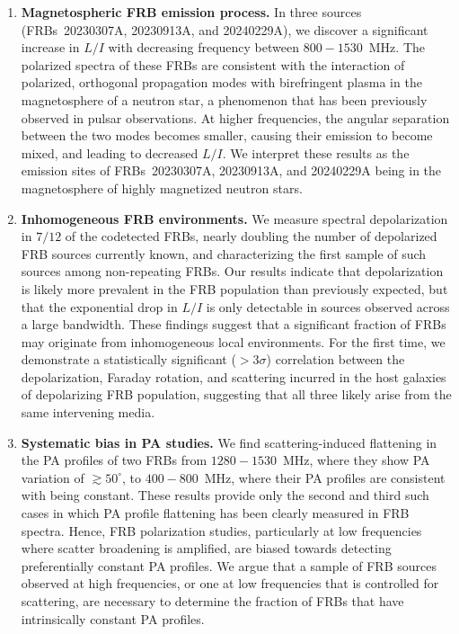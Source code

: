 \documentclass[twocolumn, linenumbers]{aastex701}
\begin{document}
\begin{enumerate}
    \item \textbf{Magnetospheric FRB emission process.} In three sources (FRBs~20230307A, 20230913A, and 20240229A), we discover a significant increase in $L/I$ with decreasing frequency between $800-1530$~MHz. The polarized spectra of these FRBs are consistent with the interaction of polarized, orthogonal propagation modes with birefringent plasma in the magnetosphere of a neutron star, a phenomenon that has been previously observed in pulsar observations. At higher frequencies, the angular separation between the two modes becomes smaller, causing their emission to become mixed, and leading to decreased $L/I$. We interpret these results as the emission sites of FRBs~20230307A, 20230913A, and 20240229A being in the magnetosphere of highly magnetized neutron stars.
    \item \textbf{Inhomogeneous FRB environments.} We measure spectral depolarization in $7/12$ of the codetected FRBs, nearly doubling the number of depolarized FRB sources currently known, and characterizing the first sample of such sources among non-repeating FRBs. Our results indicate that depolarization is likely more prevalent in the FRB population than previously expected, but that the exponential drop in $L/I$ is only detectable in sources observed across a large bandwidth. These findings suggest that a significant fraction of FRBs may originate from inhomogeneous local environments. For the first time, we demonstrate a statistically significant ($> 3\sigma$) correlation between the depolarization, Faraday rotation, and scattering incurred in the host galaxies of depolarizing FRB population, suggesting that all three likely arise from the same intervening media.
    \item \textbf{Systematic bias in PA studies.} We find scattering-induced flattening in the PA profiles of two FRBs from $1280-1530$~MHz, where they show PA variation of $\gtrsim 50^\circ$, to $400-800$~MHz, where their PA profiles are consistent with being constant. These results provide only the second and third such cases in which PA profile flattening has been clearly measured in FRB spectra. Hence, FRB polarization studies, particularly at low frequencies where scatter broadening is amplified, are biased towards detecting preferentially constant PA profiles. We argue that a sample of FRB sources observed at high frequencies, or one at low frequencies that is controlled for scattering, are necessary to determine the fraction of FRBs that have intrinsically constant PA profiles.
\end{enumerate}
\end{document}
